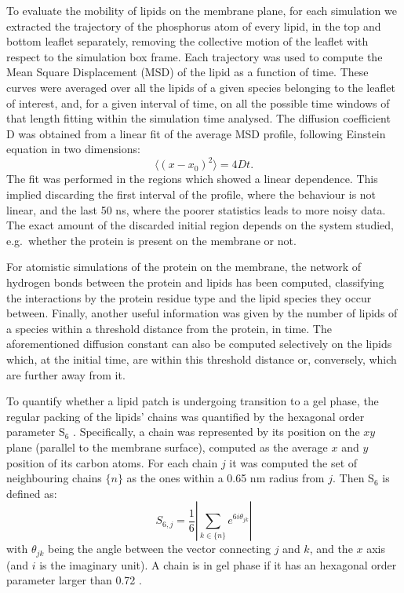 To evaluate the mobility of lipids on the membrane plane, for each simulation we extracted the trajectory of the phosphorus atom of every lipid, in the top and bottom leaflet separately, removing the collective motion of the leaflet with respect to the simulation box frame. Each trajectory was used to compute the Mean Square Displacement (MSD) of the lipid as a function of time. These curves were averaged over all the lipids of a given species belonging to the leaflet  of interest, and, for a given interval of time, on all the possible time windows of that length fitting within the simulation time analysed. The diffusion coefficient D was obtained from a linear fit of the average MSD profile, following Einstein equation in two dimensions:
\begin{equation}
\langle \left( x - x_0 \right)^2 \rangle = 4Dt.
\end{equation}
The fit was performed in the regions which showed a linear dependence. This implied discarding the first interval of the profile, where the behaviour is not linear, and the last 50 ns, where the poorer statistics leads to more noisy data. The exact amount of the discarded initial region depends on the system studied, e.g.\ whether the protein is present on the membrane or not.

For atomistic simulations of the protein on the membrane, the network of hydrogen bonds between the protein and lipids has been computed, classifying the interactions by the protein residue type and the lipid species they occur between.
%
Finally, another useful information was given by the number of lipids of a species within a threshold distance from the protein, in time.
%
The aforementioned diffusion constant can also be computed selectively on the lipids which, at the initial time, are within this threshold distance or, conversely, which are further away from it.

To quantify whether a lipid patch is undergoing transition to a gel phase, the regular packing of the lipids' chains was quantified by the hexagonal order parameter S$_6$ \cite{Uppulury2015}. Specifically, a chain was represented by its position on the $xy$ plane (parallel to the membrane surface), computed as the average $x$ and $y$ position of its carbon atoms.
%
For each chain $j$ it was computed the set of neighbouring chains $\{n\}$ as the ones within a 0.65 nm radius from $j$. Then S$_6$ is defined as:
\begin{equation}
S_{6,j} = \frac{1}{6} \left| \sum_{k \in \{n\}} e^{6i\theta_{jk}} \right|
\end{equation}
with $\theta_{jk}$ being the angle between the vector connecting $j$ and $k$, and the $x$ axis (and $i$ is the imaginary unit). A chain is in gel phase if it has an hexagonal order parameter larger than 0.72 \cite{Uppulury2015}.


